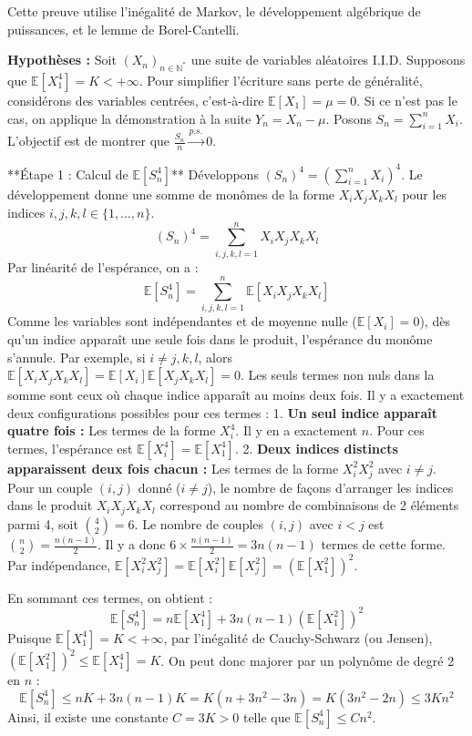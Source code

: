 \documentclass[11pt,a4paper]{article}
\begin{document}
Cette preuve utilise l'inégalité de Markov, le développement algébrique de puissances, et le lemme de Borel-Cantelli.

\textbf{Hypothèses :}
Soit $(X_n)_{n \in \mathbb{N}^*}$ une suite de variables aléatoires I.I.D.
Supposons que $\mathbb{E}[X_1^4] = K < +\infty$.
Pour simplifier l'écriture sans perte de généralité, considérons des variables centrées, c'est-à-dire $\mathbb{E}[X_1] = \mu = 0$. Si ce n'est pas le cas, on applique la démonstration à la suite $Y_n = X_n - \mu$.
Posons $S_n = \sum_{i=1}^n X_i$. L'objectif est de montrer que $\frac{S_n}{n} \xrightarrow{p.s.} 0$.

**Étape 1 : Calcul de $\mathbb{E}[S_n^4]$**
Développons $(S_n)^4 = \left(\sum_{i=1}^n X_i\right)^4$.
Le développement donne une somme de monômes de la forme $X_i X_j X_k X_l$ pour les indices $i, j, k, l \in \{1, \dots, n\}$.
$$ (S_n)^4 = \sum_{i,j,k,l=1}^n X_i X_j X_k X_l $$
Par linéarité de l'espérance, on a :
$$ \mathbb{E}[S_n^4] = \sum_{i,j,k,l=1}^n \mathbb{E}[X_i X_j X_k X_l] $$
Comme les variables sont indépendantes et de moyenne nulle ($\mathbb{E}[X_i] = 0$), dès qu'un indice apparaît une seule fois dans le produit, l'espérance du monôme s'annule.
Par exemple, si $i \neq j, k, l$, alors $\mathbb{E}[X_i X_j X_k X_l] = \mathbb{E}[X_i] \mathbb{E}[X_j X_k X_l] = 0$.
Les seuls termes non nuls dans la somme sont ceux où chaque indice apparaît au moins deux fois. Il y a exactement deux configurations possibles pour ces termes :
1. \textbf{Un seul indice apparaît quatre fois :} Les termes de la forme $X_i^4$. Il y en a exactement $n$.
   Pour ces termes, l'espérance est $\mathbb{E}[X_i^4] = \mathbb{E}[X_1^4]$.
2. \textbf{Deux indices distincts apparaissent deux fois chacun :} Les termes de la forme $X_i^2 X_j^2$ avec $i \neq j$.
   Pour un couple $(i,j)$ donné ($i \neq j$), le nombre de façons d'arranger les indices dans le produit $X_i X_j X_k X_l$ correspond au nombre de combinaisons de 2 éléments parmi 4, soit $\binom{4}{2} = 6$.
   Le nombre de couples $(i,j)$ avec $i < j$ est $\binom{n}{2} = \frac{n(n-1)}{2}$.
   Il y a donc $6 \times \frac{n(n-1)}{2} = 3n(n-1)$ termes de cette forme.
   Par indépendance, $\mathbb{E}[X_i^2 X_j^2] = \mathbb{E}[X_i^2] \mathbb{E}[X_j^2] = (\mathbb{E}[X_1^2])^2$.

En sommant ces termes, on obtient :
$$ \mathbb{E}[S_n^4] = n \mathbb{E}[X_1^4] + 3n(n-1) (\mathbb{E}[X_1^2])^2 $$
Puisque $\mathbb{E}[X_1^4] = K < +\infty$, par l'inégalité de Cauchy-Schwarz (ou Jensen), $(\mathbb{E}[X_1^2])^2 \leq \mathbb{E}[X_1^4] = K$.
On peut donc majorer par un polynôme de degré 2 en $n$ :
$$ \mathbb{E}[S_n^4] \leq n K + 3n(n-1) K = K(n + 3n^2 - 3n) = K(3n^2 - 2n) \leq 3K n^2 $$
Ainsi, il existe une constante $C = 3K > 0$ telle que $\mathbb{E}[S_n^4] \leq C n^2$.
\end{document}
